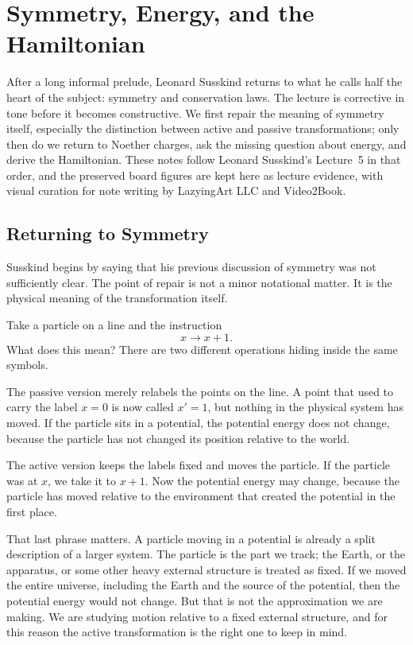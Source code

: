 \chapter{Symmetry, Energy, and the Hamiltonian}

After a long informal prelude, Leonard Susskind returns to what he calls half the heart of the subject: symmetry and conservation laws. The lecture is corrective in tone before it becomes constructive. We first repair the meaning of symmetry itself, especially the distinction between active and passive transformations; only then do we return to Noether charges, ask the missing question about energy, and derive the Hamiltonian. These notes follow Leonard Susskind's Lecture~5 in that order, and the preserved board figures are kept here as lecture evidence, with visual curation for note writing by LazyingArt LLC and Video2Book.

\section{Returning to Symmetry}

Susskind begins by saying that his previous discussion of symmetry was not sufficiently clear. The point of repair is not a minor notational matter. It is the physical meaning of the transformation itself.

Take a particle on a line and the instruction
\[
x \to x+1.
\]
What does this mean? There are two different operations hiding inside the same symbols.

The passive version merely relabels the points on the line. A point that used to carry the label \(x=0\) is now called \(x'=1\), but nothing in the physical system has moved. If the particle sits in a potential, the potential energy does not change, because the particle has not changed its position relative to the world.

The active version keeps the labels fixed and moves the particle. If the particle was at \(x\), we take it to \(x+1\). Now the potential energy may change, because the particle has moved relative to the environment that created the potential in the first place.

That last phrase matters. A particle moving in a potential is already a split description of a larger system. The particle is the part we track; the Earth, or the apparatus, or some other heavy external structure is treated as fixed. If we moved the entire universe, including the Earth and the source of the potential, then the potential energy would not change. But that is not the approximation we are making. We are studying motion relative to a fixed external structure, and for this reason the active transformation is the right one to keep in mind.


